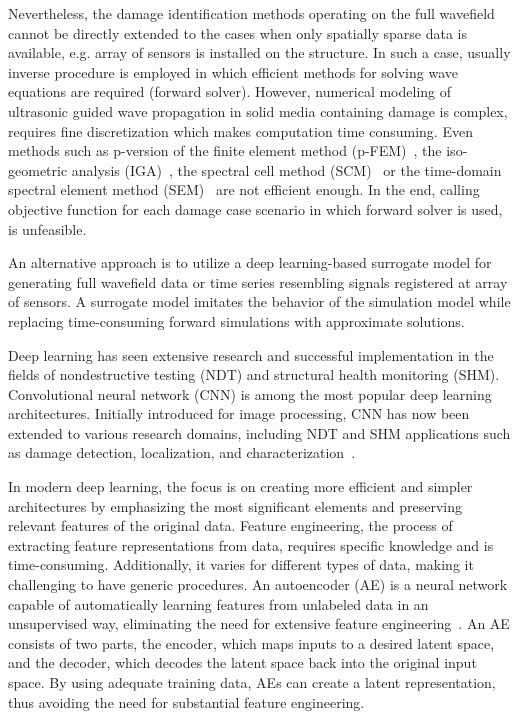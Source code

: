 Nevertheless, the damage identification methods operating on the full wavefield cannot be directly extended to the cases when only spatially sparse data is available, e.g. array of sensors is installed on the structure.
In such a case, usually inverse procedure is employed in which efficient methods for solving wave equations are required (forward solver).  
However, numerical modeling of ultrasonic guided wave propagation in solid media containing damage is complex, requires fine discretization which makes computation time consuming.
Even methods such as p-version of the finite element method (p-FEM)~\cite{Duczek2013}, the iso-geometric analysis (IGA)~\cite{Anitescu2019}, the spectral cell method (SCM)~\cite{Mossaiby2019} or the time-domain spectral element method (SEM)~\cite{Ostachowicz2012} are not efficient enough.
In the end, calling objective function for each damage case scenario in which forward solver is used, is unfeasible.

An alternative approach is to utilize a deep learning-based surrogate model for generating full wavefield data or time series resembling signals registered at array of sensors. 
A surrogate model imitates the behavior of the simulation model while replacing time-consuming forward simulations with approximate solutions.

Deep learning has seen extensive research and successful implementation in the fields of nondestructive testing (NDT) and structural health monitoring (SHM). 
Convolutional neural network (CNN) is among the most popular deep learning architectures. 
Initially introduced for image processing, CNN has now been extended to various research domains, including NDT and SHM applications such as damage detection, localization, and characterization~\cite{rautela2019deep, pandey2022explainable, ijjeh2021full, ijjeh2022deep}.

In modern deep learning, the focus is on creating more efficient and simpler architectures by emphasizing the most significant elements and preserving relevant features of the original data. 
Feature engineering, the process of extracting feature representations from data, requires specific knowledge and is time-consuming. 
Additionally, it varies for different types of data, making it challenging to have generic procedures. 
An autoencoder (AE) is a neural network capable of automatically learning features from unlabeled data in an unsupervised way, eliminating the need for extensive feature 
engineering~\cite{pinaya2020autoencoders}. 
An AE consists of two parts, the encoder, which maps inputs to a desired latent space, and the decoder, which decodes the latent space back into the original input space. 
By using adequate training data, AEs can create a latent representation, thus avoiding the need for substantial feature engineering.

